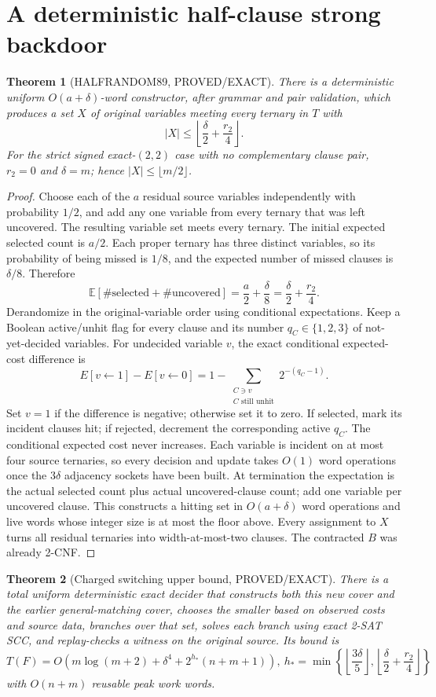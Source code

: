 \documentclass[11pt]{article}
\newtheorem{theorem}{Theorem}
\begin{document}
\section{A deterministic half-clause strong backdoor}
\begin{theorem}[HALFRANDOM89, PROVED/EXACT]
There is a deterministic uniform $O(a+\delta)$-word constructor, after grammar and pair validation, which produces a set $X$ of original variables meeting every ternary in $T$ with
\[
\boxed{|X|\le\left\lfloor\frac{\delta}{2}+\frac{r_2}{4}\right\rfloor.}
\]
For the strict signed exact-$(2,2)$ case with no complementary clause pair, $r_2=0$ and $\delta=m$; hence $|X|\le\lfloor m/2\rfloor$.
\end{theorem}
\begin{proof}
Choose each of the $a$ residual source variables independently with probability $1/2$, and add any one variable from every ternary that was left uncovered. The resulting variable set meets every ternary. The initial expected selected count is $a/2$. Each proper ternary has three distinct variables, so its probability of being missed is $1/8$, and the expected number of missed clauses is $\delta/8$. Therefore
\[
\mathbb E[\#\text{selected}+\#\text{uncovered}]
=\frac a2+\frac\delta8=\frac{\delta}{2}+\frac{r_2}{4}.
\]
Derandomize in the original-variable order using conditional expectations. Keep a Boolean active/unhit flag for every clause and its number $q_C\in\{1,2,3\}$ of not-yet-decided variables. For undecided variable $v$, the exact conditional expected-cost difference is
\[
E[v\gets1]-E[v\gets0]
=1-\sum_{\substack{C\ni v\\C\text{ still unhit}}}2^{-(q_C-1)}.
\]
Set $v=1$ if the difference is negative; otherwise set it to zero. If selected, mark its incident clauses hit; if rejected, decrement the corresponding active $q_C$. The conditional expected cost never increases. Each variable is incident on at most four source ternaries, so every decision and update takes $O(1)$ word operations once the $3\delta$ adjacency sockets have been built. At termination the expectation is the actual selected count plus actual uncovered-clause count; add one variable per uncovered clause. This constructs a hitting set in $O(a+\delta)$ word operations and live words whose integer size is at most the floor above. Every assignment to $X$ turns all residual ternaries into width-at-most-two clauses. The contracted $B$ was already 2-CNF.
\end{proof}
\begin{theorem}[Charged switching upper bound, PROVED/EXACT]
There is a total uniform deterministic exact decider that constructs both this new cover and the earlier general-matching cover, chooses the smaller based on observed costs and source data, branches over that set, solves each branch using exact 2-SAT SCC, and replay-checks a witness on the original source. Its bound is
\[
\boxed{
T(F)=O\left(m\log(m+2)+\delta^4+
2^{h_*}(n+m+1)\right),\
h_*=\min\left\{\left\lfloor\frac{3\delta}{5}\right\rfloor,
\left\lfloor\frac{\delta}{2}+\frac{r_2}{4}\right\rfloor\right\}
}
\]
with $O(n+m)$ reusable peak work words.
\end{theorem}
\end{document}

